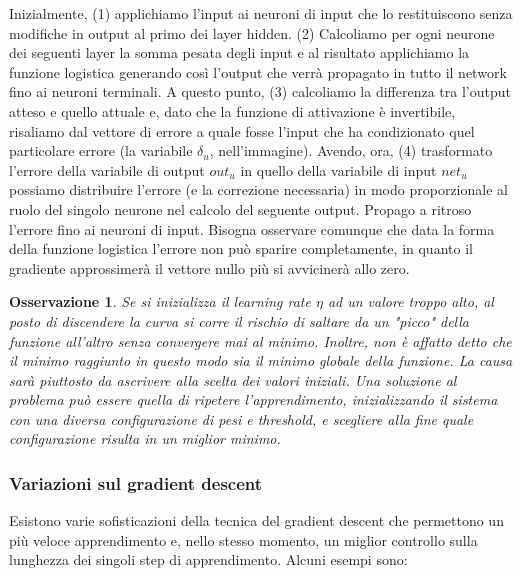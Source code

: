 \documentclass[10pt,a4paper]{article}
\newtheorem{remark}{Osservazione}
\begin{document}
Inizialmente, (1) applichiamo l'input ai neuroni di input che lo restituiscono senza modifiche in output al primo dei layer hidden. (2) Calcoliamo per ogni neurone dei seguenti layer la somma pesata degli input e al risultato applichiamo la funzione logistica generando così l'output che verrà propagato in tutto il network fino ai neuroni terminali. A questo punto, (3) calcoliamo la differenza tra l'output atteso e quello attuale e, dato che la funzione di attivazione è invertibile, risaliamo dal vettore di errore a quale fosse l'input che ha condizionato quel particolare errore (la variabile $\delta_u$, nell'immagine). Avendo, ora, (4) trasformato l'errore della variabile di output $out_u$ in quello della variabile di input $net_u$ possiamo distribuire l'errore (e la correzione necessaria) in modo proporzionale al ruolo del singolo neurone nel calcolo del seguente output. Propago a ritroso l'errore fino ai neuroni di input. Bisogna osservare comunque che data la forma della funzione logistica l'errore non può sparire completamente, in quanto il gradiente approssimerà il vettore nullo più si avvicinerà allo zero. 

\begin{remark}
\emph{Se si inizializza il learning rate $\eta$ ad un valore troppo alto, al posto di discendere la curva si corre il rischio di saltare da un "picco" della funzione all'altro senza convergere mai al minimo. Inoltre, non è affatto detto che il minimo raggiunto in questo modo sia il minimo globale della funzione. La causa sarà piuttosto da ascrivere alla scelta dei valori iniziali. Una soluzione al problema può essere quella di ripetere l'apprendimento, inizializzando il sistema con una diversa configurazione di pesi e threshold, e scegliere alla fine quale configurazione risulta in un miglior minimo.}
\end{remark}

\subsubsection{Variazioni sul gradient descent}

Esistono varie sofisticazioni della tecnica del gradient descent che permettono un più veloce apprendimento e, nello stesso momento, un miglior controllo sulla lunghezza dei singoli step di apprendimento. Alcuni esempi sono:
\end{document}
